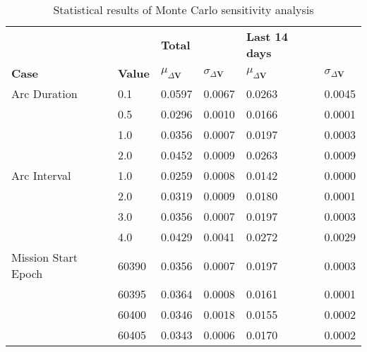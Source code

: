\begin{table}[h!]
\centering
\begin{tabular}{llllll}
 &  & \cellcolor[HTML]{EFEFEF}\textbf{Total} &  & \cellcolor[HTML]{EFEFEF}\textbf{Last 14 days} &  \\
\rowcolor[HTML]{EFEFEF} 
\textbf{Case} & \textbf{Value} & \textbf{$\mu_{\Delta \boldsymbol{V}}$} & \textbf{$\sigma_{\Delta \boldsymbol{V}}$} & \textbf{$\mu_{\Delta \boldsymbol{V}}$} & \textbf{$\sigma_{\Delta \boldsymbol{V}}$} \\ 
Arc Duration & 0.1 & 0.0597 & 0.0067 & 0.0263 & 0.0045 \\ 
 & 0.5 & 0.0296 & 0.0010 & 0.0166 & 0.0001 \\ 
 & 1.0 & 0.0356 & 0.0007 & 0.0197 & 0.0003 \\ 
 & 2.0 & 0.0452 & 0.0009 & 0.0263 & 0.0009 \\ 
Arc Interval & 1.0 & 0.0259 & 0.0008 & 0.0142 & 0.0000 \\ 
 & 2.0 & 0.0319 & 0.0009 & 0.0180 & 0.0001 \\ 
 & 3.0 & 0.0356 & 0.0007 & 0.0197 & 0.0003 \\ 
 & 4.0 & 0.0429 & 0.0041 & 0.0272 & 0.0029 \\ 
Mission Start Epoch & 60390 & 0.0356 & 0.0007 & 0.0197 & 0.0003 \\ 
 & 60395 & 0.0364 & 0.0008 & 0.0161 & 0.0001 \\ 
 & 60400 & 0.0346 & 0.0018 & 0.0155 & 0.0002 \\ 
 & 60405 & 0.0343 & 0.0006 & 0.0170 & 0.0002 \\ 
\end{tabular}
\caption{Statistical results of Monte Carlo sensitivity analysis}
\label{tab:SensitivityAnalysis}
\end{table}